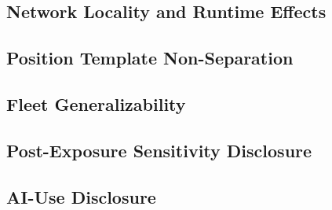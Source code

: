 \subsection{Network Locality and Runtime Effects}

\subsection{Position Template Non-Separation}

\subsection{Fleet Generalizability}

\subsection{Post-Exposure Sensitivity Disclosure}

\subsection{AI-Use Disclosure}
